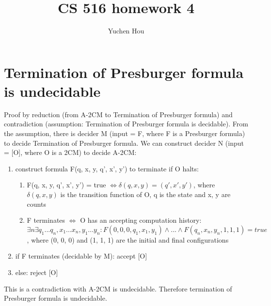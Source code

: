 \documentclass{article}
\begin{document}
\lstset{language=python, tabsize=4}
\title{CS 516 homework 4}
\author{Yuchen Hou}
\maketitle

\section{Termination of Presburger formula is undecidable}
Proof by reduction (from A-2CM to Termination of Presburger formula) and 
contradiction (assumption: Termination of Presburger formula is decidable).
From the assumption, there is decider M (input = F, where F is a Presburger 
formula) to decide Termination of Presburger formula.
We can construct decider N (input = [O], where O is a 2CM) to decide A-2CM:
\begin{enumerate}
	\item construct formula F(q, x, y, q', x', y') to terminate if O halts:
	\begin{enumerate}
		\item F(q, x, y, q', x', y') = true $ \iff \delta(q, x, y) = (q', x', 
		y') $, where $ \delta(q, x, y) $ is the transition function of O, q is 
		the state and x, y are counts
		\item F terminates $ \iff $ O has an accepting computation history: $ 
		\exists n \exists q_1 ... q_n, x_1 ... x_n, y_1 ... y_n : F(0, 0, 0, 
		q_1, x_1, y_1) \land ... \land F(q_n, x_n, y_n, 1, 1, 1) = true$, where 
		(0, 0, 0) and (1, 1, 1) are the initial and final configurations
	\end{enumerate}
	\item if F terminates (decidable by M): accept [O]
	\item else: reject [O]
\end{enumerate}
This is a contradiction with A-2CM is undecidable. Therefore termination of 
Presburger formula is undecidable.
\end{document}
